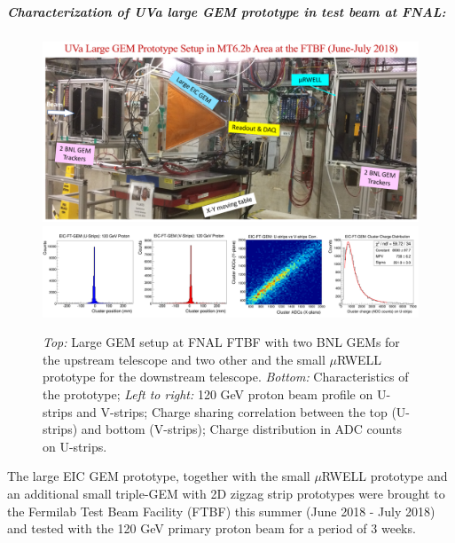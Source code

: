 %
\subparagraph*{\textbf Characterization of UVa large GEM prototype in test beam at FNAL:}
%
\begin{figure}[htb]
\centering
\includegraphics[width=1\columnwidth,trim={0pt 0mm 0pt 0mm},clip]{UVa_plots/ftbfSetup}
\includegraphics[width=1\columnwidth,trim={0pt 0mm 0pt 0mm},clip]{UVa_plots/eicProtonBeam}
\caption{\label{fig:eicProtonBeam} \textit{Top:} Large GEM setup at FNAL FTBF with two BNL GEMs for the upstream telescope and two other and the  small $\mu$RWELL prototype for the downstream telescope. \textit{Bottom:} Characteristics of the prototype; \textit{Left to right:} 120 GeV proton beam profile on U-strips and V-strips; Charge sharing correlation between the top (U-strips) and bottom (V-strips); Charge distribution in ADC counts on U-strips.}
\end{figure}
%
The large EIC GEM prototype, together with the small $\mu$RWELL prototype and an additional small triple-GEM with 2D zigzag strip prototypes were brought to the Fermilab Test Beam Facility (FTBF) this summer (June 2018 - July 2018) and tested with the 120 GeV primary proton beam  for a period of 3 weeks.
